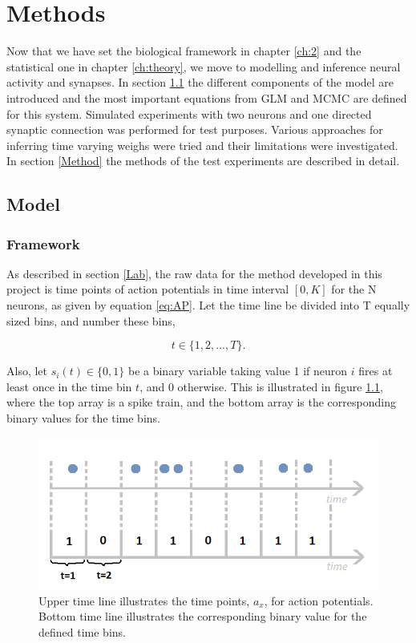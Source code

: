 
\chapter{Methods}
\label{ch:methods}

Now that we have set the biological framework in chapter \ref{ch:2} and the statistical one in chapter \ref{ch:theory}, we move to modelling and inference neural activity and synapses. In section \ref{set_up} the different components of the model are introduced and the most important equations from GLM and MCMC are defined for this system. Simulated experiments with two neurons and one directed synaptic connection was performed for test purposes. Various approaches for inferring time varying weighs were tried and their limitations were investigated. In section \ref{Method} the methods of the test experiments are described in detail.

\section{Model}
\label{set_up}

\subsection{Framework}
As described in section \ref{Lab}, the raw data for the method developed in this project is time points of action potentials in time interval $[0,K]$ for the N neurons, as given by equation \ref{eq:AP}. Let the time line be divided into T equally sized bins, and number these bins,

\begin{equation}
    t \in \{1, 2, ..., T\}.
\end{equation}

Also, let $s_{i}(t) \in \{0,1\}$ be a binary variable taking value 1 if neuron $i$ fires at least once in the time bin $t$, and 0 otherwise. This is illustrated in figure \ref{fig:spike_train}, where the top array is a spike train, and the bottom array is the corresponding binary values for the time bins.

\begin{figure}[h]
\caption{Upper time line illustrates the time points, $a_x$, for action potentials. Bottom time line illustrates the corresponding binary value for the defined time bins.}
\label{fig:spike_train}
    \centering
    \includegraphics[scale=0.7]{fig/Spike_train_illustration2.png}
\end{figure} 

